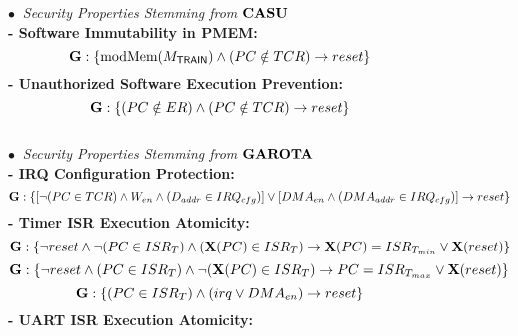 \begin{figure*}[t]
    \begin{mdframed}[userdefinedwidth=0.95\textwidth]
        $\bullet\ $ {\it Security Properties Stemming from} $\boldsymbol{{{\rm CASU}}}$\\
        \textbf{- \small Software Immutability in PMEM:}\\        
        \begin{equation}\label{eq:hwprop_wp}
            \textbf{G}: \{\text{modMem}(M_{{\sf{TRAIN}}}) \land (PC \notin TCR) \rightarrow reset\}
        \end{equation}
        \textbf{- \small Unauthorized Software Execution Prevention:}
        \begin{equation}\label{eq:hwprop_usep}
            \textbf{G}: \{(PC \notin ER) \land (PC \notin TCR) \rightarrow reset\}
        \end{equation} \\
        $\bullet\ $ {\it Security Properties Stemming from} $\boldsymbol{{{\rm GAROTA}}}$\\
        \textbf{- \small IRQ Configuration Protection:}
        \begin{equation}\label{eq:irqcfg-protection}
            \textbf{G}: \{[\neg(PC \in TCR) \land W_{en} \land (D_{addr} \in IRQ_{cfg})] \lor [DMA_{en} \land (DMA_{addr} \in IRQ_{cfg})] \rightarrow reset\}
        \end{equation}
        \textbf{- \small Timer ISR Execution Atomicity:}        
        \begin{equation}\label{eq:timer-isr-protection1}
            \textbf{G}: \{\neg reset \land \neg (PC \in ISR_T) \land (\textbf{X}(PC) \in ISR_T) \rightarrow \textbf{X}(PC) = ISR_{T_{min}} \lor \textbf{X}(reset) \}
        \end{equation}
        \begin{equation}\label{eq:timer-isr-protection2}
            \textbf{G}: \{\neg reset \land (PC \in ISR_T) \land \neg (\textbf{X}(PC) \in ISR_T) \rightarrow PC = ISR_{T_{max}} \lor \textbf{X}(reset) \}            
        \end{equation}
        \begin{equation}\label{eq:timer-isr-protection3}
            \textbf{G}: \{(PC \in ISR_T) \land (irq \lor DMA_{en}) \rightarrow reset \}
        \end{equation}
        \textbf{- \small UART ISR Execution Atomicity:}        
        \begin{equation}\label{eq:uart-isr-protection1}

\end{equation}
\end{mdframed}
\end{figure*}
